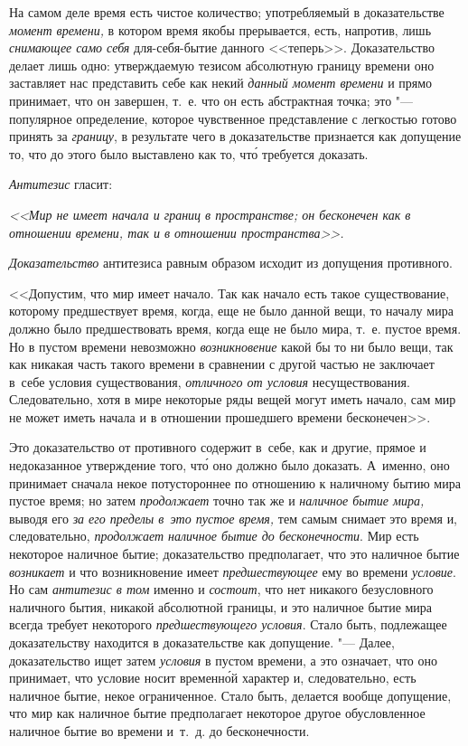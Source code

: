 На самом деле время есть чистое количество; употребляемый в доказательстве
{\em момент времени,} в котором время якобы прерывается, есть, напротив,
лишь {\em снимающее само себя} для-себя-бытие данного <<теперь>>.
Доказательство делает лишь одно: утверждаемую тезисом абсолютную границу
времени оно заставляет нас представить себе как некий
{\em данный момент времени} и прямо принимает, что он завершен, т.~е. что он
есть абстрактная точка; это "--- популярное определение, которое чувственное
представление с легкостью готово принять за {\em границу}, в результате чего
в доказательстве признается как допущение то, что до этого было выставлено как
то, чт\'{о} требуется доказать.

{\em Антитезис} гласит:

{\em <<Мир не имеет начала и границ в пространстве; он бесконечен
как в отношении времени, так и в отношении пространства>>.}

{\em Доказательство} антитезиса равным образом исходит из допущения противного.

<<Допустим, что мир имеет начало. Так как начало есть такое существование,
которому предшествует время, когда, еще не было данной вещи, то началу мира
должно было предшествовать время, когда еще не было мира, т.~е. пустое время.
Но в пустом времени невозможно {\em возникновение} какой бы то ни было вещи,
так как никакая часть такого времени в сравнении с другой частью не заключает
в~себе условия существования, {\em отличного от условия} несуществования.
Следовательно, хотя в мире некоторые ряды вещей могут иметь начало,
сам мир не может иметь начала и в отношении прошедшего времени бесконечен>>.

Это доказательство от противного содержит в~себе, как и другие, прямое и
недоказанное утверждение того, чт\'{о} оно должно было доказать. А~именно, оно
принимает сначала некое потустороннее по отношению к наличному бытию мира
пустое время; но затем {\em продолжает} точно так же и
{\em наличное бытие мира,} выводя его {\em за его пределы в~это пустое время,}
тем самым снимает это время и, следовательно,
{\em продолжает наличное бытие до бесконечности}. Мир есть некоторое
наличное бытие; доказательство предполагает, что это наличное бытие
{\em возникает} и что возникновение имеет {\em предшествующее} ему во времени
{\em условие}. Но сам {\em антитезис в том} именно и {\em состоит}, что нет
никакого безусловного наличного бытия, никакой абсолютной границы, и это наличное
бытие мира всегда требует некоторого {\em предшествующего условия}. Стало
быть, подлежащее доказательству находится в доказательстве как
допущение. "--- Далее, доказательство ищет затем {\em условия} в пустом
времени, а это означает, что оно принимает, что условие носит временн\'{о}й
характер и, следовательно, есть наличное бытие, некое ограниченное. Стало быть,
делается вообще допущение, что мир как наличное бытие предполагает некоторое
другое обусловленное наличное бытие во времени и~т.~д. до бесконечности.

